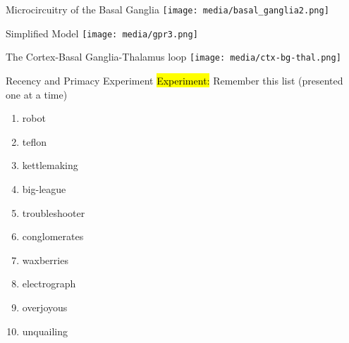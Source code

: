 \documentclass[handout,aspectratio=169]{beamer}
\begin{document}
	\begin{frame}{Microcircuitry of the Basal Ganglia}
		\centering
		\texttt{[image: media/basal\_ganglia2.png]}
	\end{frame}

	\begin{frame}{Simplified Model}
		\centering
		\texttt{[image: media/gpr3.png]}
	\end{frame}

	\begin{frame}{The Cortex-Basal Ganglia-Thalamus loop}
		\centering
		\texttt{[image: media/ctx-bg-thal.png]}
	\end{frame}


  \begin{frame}{Recency and Primacy Experiment}
		\centering
		\Large
		\hl{Experiment:} Remember this list (presented one at a time)
		\begin{multicols}{2}
		\begin{enumerate}
			\centering
			\setlength{\itemsep}{0.25cm}
			\item robot
			\item teflon
			\item kettlemaking
			\item big-league
			\item troubleshooter
			\item conglomerates
			\item waxberries
			\item electrograph
			\item overjoyous
			\item unquailing
		\end{enumerate}
		\end{multicols}
	\end{frame}
\end{document}

